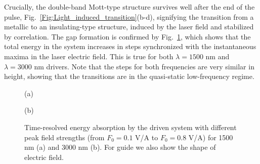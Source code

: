 Crucially, the double-band Mott-type structure
survives well after the end of the pulse, 
Fig.~\ref{Fig:Light_induced_transition}(b-d), signifying 
the transition from a metallic to an insulating-type structure, 
induced by the laser field and stabilized by correlation.
The gap formation is confirmed by Fig.~\ref{Fig:Time_resolved_energy}, which shows that
the total energy in the system increases in steps synchronized with the instantaneous maxima in the laser electric field. 
This is true for both $\lambda=1500$ nm and $\lambda=3000$ nm
drivers. Note that the steps for both frequencies are
very similar in height, showing that the transitions are
in the quasi-static low-frequency regime.
\begin{figure}[h!]
\begin{minipage}[h]{0.5\linewidth}
 (a) \\
\end{minipage}
\hfill
\begin{minipage}[h]{0.5\linewidth}
 (b) \\
\end{minipage}
\caption{Time-resolved energy absorption by the 
driven system with different peak field strengths (from $F_0=0.1$ V/A to $F_0=0.8$ V/A)
for 1500 nm (a) and 3000 nm (b). For guide we also show the shape of electric field.}
\label{Fig:Time_resolved_energy}
\end{figure}

